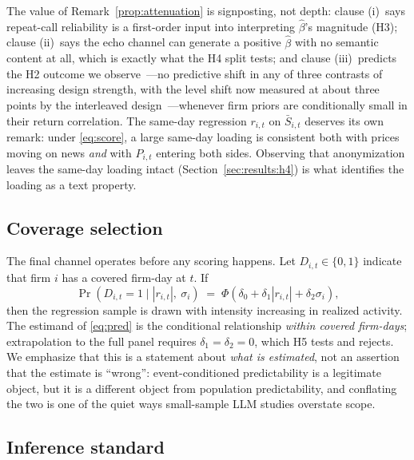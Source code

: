 The value of Remark~\ref{prop:attenuation} is signposting, not depth: clause (i)~says repeat-call reliability is a first-order input into interpreting $\hat\beta$'s magnitude (H3); clause (ii)~says the echo channel can generate a positive $\hat\beta$ with no semantic content at all, which is exactly what the H4 split tests; and clause (iii)~predicts the H2 outcome we observe~---no predictive shift in any of three contrasts of increasing design strength, with the level shift now measured at about three points by the interleaved design~---whenever firm priors are conditionally small in their return correlation. The same-day regression $r_{i,t}$ on $\bar S_{i,t}$ deserves its own remark: under \eqref{eq:score}, a large same-day loading is consistent both with prices moving on news \emph{and} with $P_{i,t}$ entering both sides. Observing that anonymization leaves the same-day loading intact (Section~\ref{sec:results:h4}) is what identifies the loading as a text property.

\subsection{Coverage selection}\label{sec:framework:selection}

The final channel operates before any scoring happens. Let $D_{i,t}\in\{0,1\}$ indicate that firm $i$ has a covered firm-day at $t$. If
\begin{equation}\label{eq:selection}
\Pr(D_{i,t}=1 \mid |r_{i,t}|,\ \sigma_i) \;=\; \Phi\!\left(\delta_0+\delta_1 |r_{i,t}|+\delta_2 \sigma_i\right),
\end{equation}
then the regression sample is drawn with intensity increasing in realized activity. The estimand of \eqref{eq:pred} is the conditional relationship \emph{within covered firm-days}; extrapolation to the full panel requires $\delta_1=\delta_2=0$, which H5 tests and rejects. We emphasize that this is a statement about \emph{what is estimated}, not an assertion that the estimate is ``wrong'': event-conditioned predictability is a legitimate object, but it is a different object from population predictability, and conflating the two is one of the quiet ways small-sample LLM studies overstate scope.

\subsection{Inference standard}\label{sec:framework:inference}

